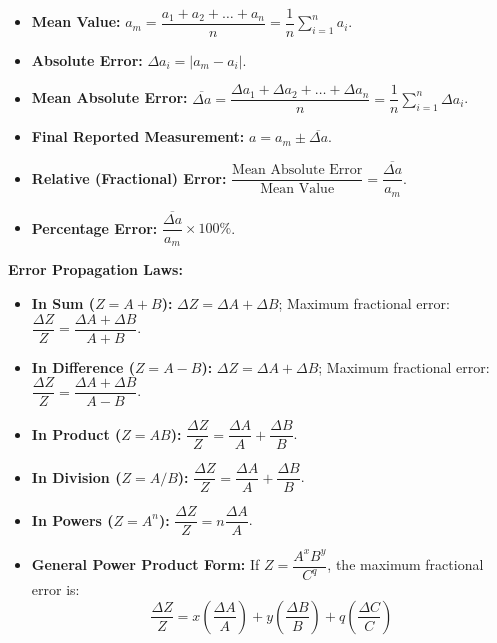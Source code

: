 \documentclass[11pt,a4paper]{article}
\begin{document}
\vspace{5pt}
\noindent{\large\textbf{\textsf{\textcolor{primaryDark}{1.8 Representation of Errors \& Combination Rules (From Notes)}}}}\\[3pt]
\begin{itemize}[leftmargin=14pt,itemsep=1pt]
  \item \textbf{Mean Value:} $a_m = \dfrac{a_1 + a_2 + \dots + a_n}{n} = \dfrac{1}{n}\sum_{i=1}^n a_i$.
  \item \textbf{Absolute Error:} $\Delta a_i = |a_m - a_i|$.
  \item \textbf{Mean Absolute Error:} $\overline{\Delta a} = \dfrac{\Delta a_1 + \Delta a_2 + \dots + \Delta a_n}{n} = \dfrac{1}{n}\sum_{i=1}^n \Delta a_i$.
  \item \textbf{Final Reported Measurement:} $a = a_m \pm \overline{\Delta a}$.
  \item \textbf{Relative (Fractional) Error:} $\dfrac{\text{Mean Absolute Error}}{\text{Mean Value}} = \dfrac{\overline{\Delta a}}{a_m}$.
  \item \textbf{Percentage Error:} $\dfrac{\overline{\Delta a}}{a_m} \times 100\%$.
\end{itemize}

\begin{tcolorbox}[formulacard]
  \textbf{\textcolor{primaryDark}{Error Propagation Laws:}}
  \begin{itemize}[leftmargin=12pt,itemsep=2pt]
    \item \textbf{In Sum ($Z = A + B$):} $\Delta Z = \Delta A + \Delta B$; \quad Maximum fractional error: $\dfrac{\Delta Z}{Z} = \dfrac{\Delta A + \Delta B}{A + B}$.
    \item \textbf{In Difference ($Z = A - B$):} $\Delta Z = \Delta A + \Delta B$; \quad Maximum fractional error: $\dfrac{\Delta Z}{Z} = \dfrac{\Delta A + \Delta B}{A - B}$.
    \item \textbf{In Product ($Z = AB$):} $\dfrac{\Delta Z}{Z} = \dfrac{\Delta A}{A} + \dfrac{\Delta B}{B}$.
    \item \textbf{In Division ($Z = A / B$):} $\dfrac{\Delta Z}{Z} = \dfrac{\Delta A}{A} + \dfrac{\Delta B}{B}$.
    \item \textbf{In Powers ($Z = A^n$):} $\dfrac{\Delta Z}{Z} = n \dfrac{\Delta A}{A}$.
    \item \textbf{General Power Product Form:} If $Z = \dfrac{A^x B^y}{C^q}$, the maximum fractional error is:
    \[
      \frac{\Delta Z}{Z} = x\left(\frac{\Delta A}{A}\right) + y\left(\frac{\Delta B}{B}\right) + q\left(\frac{\Delta C}{C}\right)
    \]
  \end{itemize}
\end{tcolorbox}
\end{document}
